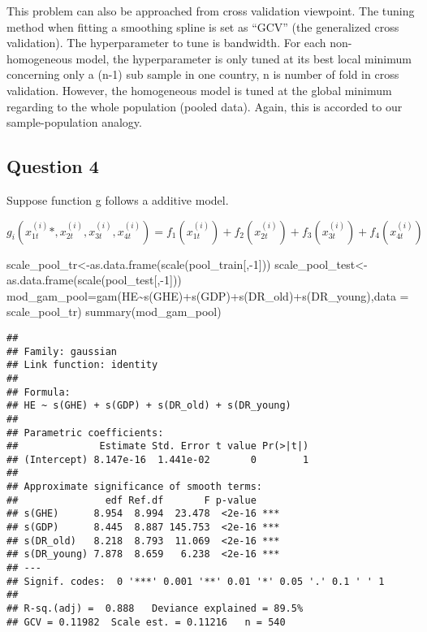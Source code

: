 \documentclass[
]{article}
\newenvironment{Shaded}{\begin{snugshade}}{\end{snugshade}}
\newcommand{\AttributeTok}[1]{\textcolor[rgb]{0.77,0.63,0.00}{#1}}
\newcommand{\DecValTok}[1]{\textcolor[rgb]{0.00,0.00,0.81}{#1}}
\newcommand{\FunctionTok}[1]{\textcolor[rgb]{0.00,0.00,0.00}{#1}}
\newcommand{\NormalTok}[1]{#1}
\newcommand{\OtherTok}[1]{\textcolor[rgb]{0.56,0.35,0.01}{#1}}
\newcommand{\SpecialCharTok}[1]{\textcolor[rgb]{0.00,0.00,0.00}{#1}}
\begin{document}
This problem can also be approached from cross validation viewpoint. The
tuning method when fitting a smoothing spline is set as ``GCV'' (the
generalized cross validation). The hyperparameter to tune is bandwidth.
For each non-homogeneous model, the hyperparameter is only tuned at its
best local minimum concerning only a (n-1) sub sample in one country, n
is number of fold in cross validation. However, the homogeneous model is
tuned at the global minimum regarding to the whole population (pooled
data). Again, this is accorded to our sample-population analogy.

\hypertarget{question-4}{%
\subsection{Question 4}\label{question-4}}

Suppose function g follows a additive model.

\[
g_i(x^{(i)}_{1t}*,x^{(i)}_{2t}, x^{(i)}_{3t}, x^{(i)}_{4t}) = f_1(x^{(i)}_{1t})+ f_2(x^{(i)}_{2t})+ f_3(x^{(i)}_{3t})+f_4(x^{(i)}_{4t}) 
\]

\begin{Shaded}
\begin{Highlighting}[]
\NormalTok{scale\_pool\_tr}\OtherTok{\textless{}{-}}\FunctionTok{as.data.frame}\NormalTok{(}\FunctionTok{scale}\NormalTok{(pool\_train[,}\SpecialCharTok{{-}}\DecValTok{1}\NormalTok{]))}
\NormalTok{scale\_pool\_test}\OtherTok{\textless{}{-}}\FunctionTok{as.data.frame}\NormalTok{(}\FunctionTok{scale}\NormalTok{(pool\_test[,}\SpecialCharTok{{-}}\DecValTok{1}\NormalTok{]))}
\NormalTok{mod\_gam\_pool}\OtherTok{=}\FunctionTok{gam}\NormalTok{(HE}\SpecialCharTok{\textasciitilde{}}\FunctionTok{s}\NormalTok{(GHE)}\SpecialCharTok{+}\FunctionTok{s}\NormalTok{(GDP)}\SpecialCharTok{+}\FunctionTok{s}\NormalTok{(DR\_old)}\SpecialCharTok{+}\FunctionTok{s}\NormalTok{(DR\_young),}\AttributeTok{data =}\NormalTok{ scale\_pool\_tr)}
\FunctionTok{summary}\NormalTok{(mod\_gam\_pool)}
\end{Highlighting}
\end{Shaded}

\begin{verbatim}
## 
## Family: gaussian 
## Link function: identity 
## 
## Formula:
## HE ~ s(GHE) + s(GDP) + s(DR_old) + s(DR_young)
## 
## Parametric coefficients:
##              Estimate Std. Error t value Pr(>|t|)
## (Intercept) 8.147e-16  1.441e-02       0        1
## 
## Approximate significance of smooth terms:
##               edf Ref.df       F p-value    
## s(GHE)      8.954  8.994  23.478  <2e-16 ***
## s(GDP)      8.445  8.887 145.753  <2e-16 ***
## s(DR_old)   8.218  8.793  11.069  <2e-16 ***
## s(DR_young) 7.878  8.659   6.238  <2e-16 ***
## ---
## Signif. codes:  0 '***' 0.001 '**' 0.01 '*' 0.05 '.' 0.1 ' ' 1
## 
## R-sq.(adj) =  0.888   Deviance explained = 89.5%
## GCV = 0.11982  Scale est. = 0.11216   n = 540
\end{verbatim}
\end{document}
